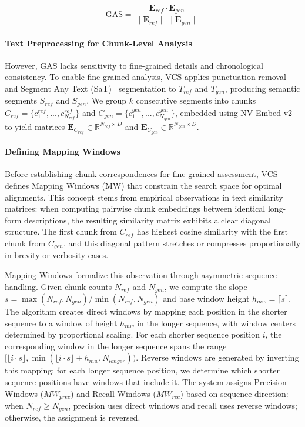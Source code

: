 \documentclass[letterpaper]{article} %
\begin{document}
\begin{equation} \label{eq:gas_revised}
\text{GAS} = \frac{\mathbf{E}_{ref} \cdot \mathbf{E}_{gen}}{\|\mathbf{E}_{ref}\| \|\mathbf{E}_{gen}\|}
\end{equation}

\paragraph{Text Preprocessing for Chunk-Level Analysis}
However, GAS lacks sensitivity to fine-grained details and chronological consistency. To enable fine-grained analysis, VCS applies punctuation removal and Segment Any Text (SaT)~\citep{frohmann-etal-2024-segment} segmentation to $T_{ref}$ and $T_{gen}$, producing semantic segments $S_{ref}$ and $S_{gen}$. We group $k$ consecutive segments into chunks $C_{ref} = \{c_1^{ref}, ..., c_{N_{ref}}^{ref}\}$ and $C_{gen} = \{c_1^{gen}, ..., c_{N_{gen}}^{gen}\}$, embedded using NV-Embed-v2 to yield matrices $\mathbf{E}_{C_{ref}} \in \mathbb{R}^{N_{ref} \times D}$ and $\mathbf{E}_{C_{gen}} \in \mathbb{R}^{N_{gen} \times D}$.

\paragraph{Defining Mapping Windows}
Before establishing chunk correspondences for fine-grained assessment, VCS defines Mapping Windows (MW) that constrain the search space for optimal alignments. This concept stems from empirical observations in text similarity matrices: when computing pairwise chunk embeddings between identical long-form descriptions, the resulting similarity matrix exhibits a clear diagonal structure. The first chunk from $C_{ref}$ has highest cosine similarity with the first chunk from $C_{gen}$, and this diagonal pattern stretches or compresses proportionally in brevity or verbosity cases.

Mapping Windows formalize this observation through asymmetric sequence handling. Given chunk counts $N_{ref}$ and $N_{gen}$, we compute the slope $s = \max(N_{ref}, N_{gen}) / \min(N_{ref}, N_{gen})$ and base window height $h_{mw} = \lceil s \rceil$. The algorithm creates direct windows by mapping each position in the shorter sequence to a window of height $h_{mw}$ in the longer sequence, with window centers determined by proportional scaling. For each shorter sequence position $i$, the corresponding window in the longer sequence spans the range $[\lfloor i \cdot s \rfloor, \min(\lfloor i \cdot s \rfloor + h_{mw}, N_{longer}))$. Reverse windows are generated by inverting this mapping: for each longer sequence position, we determine which shorter sequence positions have windows that include it. The system assigns Precision Windows ($MW_{prec}$) and Recall Windows ($MW_{rec}$) based on sequence direction: when $N_{ref} \geq N_{gen}$, precision uses direct windows and recall uses reverse windows; otherwise, the assignment is reversed.
\end{document}
